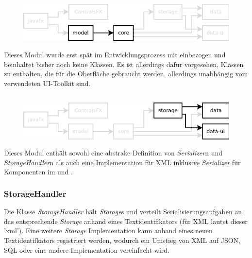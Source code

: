 \pagebreak
\subsection{\textModModel}
\label{\textModModel}
\begin{figure}[H]
	\centering
	\includegraphics[width=.8\textwidth]{module_dependencies_model.png}
\end{figure}

Dieses Modul wurde erst spät im Entwicklungsprozess mit einbezogen und beinhaltet bisher noch keine Klassen.
Es ist allerdings dafür vorgesehen, Klassen zu enthalten, die für die Oberfläche gebraucht werden, allerdings
unabhängig vom verwendeten UI-Toolkit sind.

\subsection{\textModStorage}
\label{\textModStorage}
\begin{figure}[H]
	\centering
	\includegraphics[width=.8\textwidth]{module_dependencies_storage.png}
\end{figure}

Dieses Modul enthält sowohl eine abstrake Definition von \textit{Serializer}n und \textit{StorageHandler}n
als auch eine Implementation für XML inklusive \textit{Serializer} für Komponenten im  und
.

\subsubsection{StorageHandler}
Die Klasse \textit{StorageHandler} hält \textit{Storage}s und verteilt Serialisierungsaufgaben an
das entsprechende \textit{Storage} anhand eines Textidentifikators (für XML lautet dieser 'xml').
Eine weitere \textit{Storage} Implementation kann anhand eines neuen Textidentifkators registriert werden,
wodurch ein Umstieg von XML auf JSON, SQL oder eine andere Implementation vereinfacht wird.

